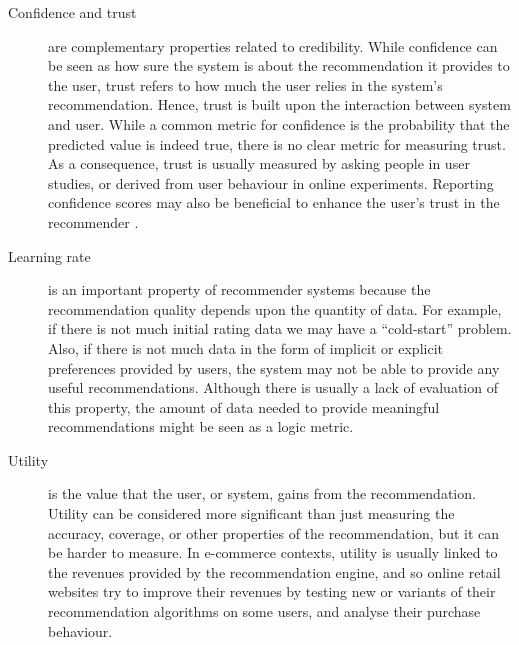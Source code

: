 \begin{description}
	\item [Confidence and trust] are complementary properties related to credibility. While confidence can be seen as how sure the system is about the recommendation it provides to the user, trust refers to how much the user relies in the system's recommendation. Hence, trust is built upon the interaction between system and user. While a common metric for confidence is the probability that the predicted value is indeed true, there is no clear metric for measuring trust. As a consequence, trust is usually measured by asking people in user studies, or derived from user behaviour in online experiments. Reporting confidence scores may also be beneficial to enhance the user's trust in the recommender \autocite{herlocker00explaining}. 

	\item [Learning rate] is an important property of recommender systems because the recommendation quality depends upon the quantity of data. For example, if there is not much initial rating data we may have a ``cold-start'' problem. Also, if there is not much data in the form of implicit or explicit preferences provided by users, the system may not be able to provide any useful recommendations. Although there is usually a lack of evaluation of this property, the amount of data needed to provide meaningful recommendations might be seen as a logic metric.

	\item [Utility] is the value that the user, or system, gains from the recommendation. Utility can be considered more significant than just measuring the accuracy, coverage, or other properties of the recommendation, but it can be harder to measure. In e-commerce contexts, utility is usually linked to the revenues provided by the recommendation engine, and so online retail websites try to improve their revenues by testing new or variants of their recommendation algorithms on some users, and analyse their purchase behaviour.
	


\end{description}







